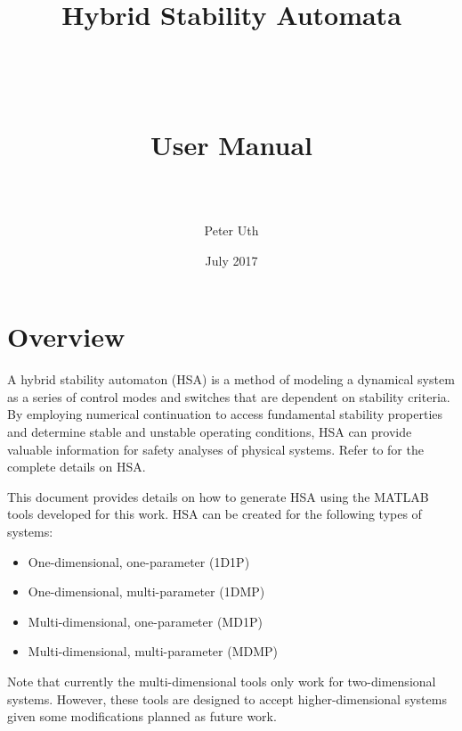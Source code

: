 \documentclass[12pt]{article}
\begin{document}
\title{\ \\ \ \\ \ \\ \ \\ \ \\Hybrid Stability Automata\\ \ \\ \ \\ \begin{Large} User Manual \\ \ \\
\end{Large}}
\date{July 2017}
\author{Peter Uth}
\maketitle

\newpage

\tableofcontents

\newpage


\section{Overview}
A hybrid stability automaton (HSA) is a method of modeling a dynamical system as a series of control modes and switches that are dependent on stability criteria. By employing numerical continuation to access fundamental stability properties and determine stable and unstable operating conditions, HSA can provide valuable information for safety analyses of physical systems. Refer to \cite{Uth_Thesis2017, Uth_Scitech2018} for the complete details on HSA.

This document provides details on how to generate HSA using the MATLAB tools developed for this work. HSA can be created for the following types of systems:

\begin{itemize}
\item One-dimensional, one-parameter (1D1P)
\item One-dimensional, multi-parameter (1DMP)
\item Multi-dimensional, one-parameter (MD1P)
\item Multi-dimensional, multi-parameter (MDMP)
\end{itemize}

\noindent Note that currently the multi-dimensional tools only work for two-dimensional systems. However, these tools are designed to accept higher-dimensional systems given some modifications planned as future work.
\end{document}
